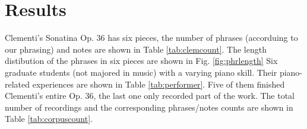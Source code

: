 \section{Results}

Clementi's Sonatina Op. 36 has six pieces, the number of phrases (accorduing to our phrasing) and notes are shown in Table \ref{tab:clemcount}. The length distibution of the phrases in six pieces are shown in Fig. \ref{fig:phrlength}
Six graduate students (not majored in music) with a varying piano skill. Their piano-related experiences are shown in Table \ref{tab:performer}. Five of them finished Clementi's entire Op. 36, the last one only recorded part of the work. The total number of recordings and the corresponding phrases/notes counts are shown in Table \ref{tab:corpuscount}. 


